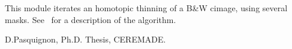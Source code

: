 This module iterates an homotopic thinning of a B\&W cimage, using
several masks.
See~\cite{Pasquigon} for a description of the algorithm.

\begin{thebibliography}{99}
D.Pasquignon,
Ph.D. Thesis, CEREMADE.
\end{thebibliography}